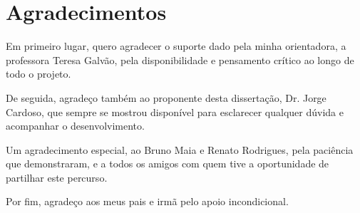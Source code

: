 \chapter*{Agradecimentos}

Em primeiro lugar, quero agradecer o suporte dado pela minha orientadora, a professora Teresa Galvão, pela disponibilidade e pensamento crítico ao longo de todo o projeto.

De seguida, agradeço também ao proponente desta dissertação, Dr. Jorge Cardoso, que sempre se mostrou disponível para esclarecer qualquer dúvida e acompanhar o desenvolvimento.

Um agradecimento especial, ao Bruno Maia e Renato Rodrigues, pela paciência que demonstraram, e a todos os amigos com quem tive a oportunidade de partilhar este percurso.

Por fim, agradeço aos meus pais e irmã pelo apoio incondicional. 

\vspace{10mm}
